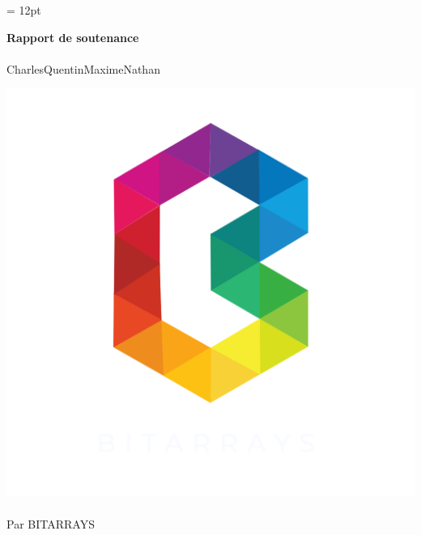 \documentclass{article}
\begin{document}
    \headsep = 12pt
		\begin{center}
			\begin{LARGE}
				\textbf{Rapport de soutenance}
				\paragraph{}Charles\hspace{0.7cm}Quentin\hspace{0.7cm}Maxime\hspace{0.7cm}Nathan
			\end{LARGE}
		\end{center}
		\vspace{1.5cm}
		\begin{center}
			\includegraphics[scale=0.3]{LogoBitarrays.png}
    		\paragraph{} Par BITARRAYS
		\end{center}
	
\end{document}
